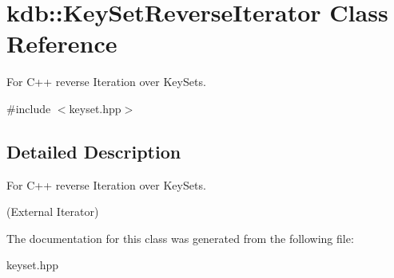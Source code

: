 \hypertarget{classkdb_1_1KeySetReverseIterator}{\section{kdb\+:\+:Key\+Set\+Reverse\+Iterator Class Reference}
\label{classkdb_1_1KeySetReverseIterator}
}


For C++ reverse Iteration over Key\+Sets.  




{\ttfamily \#include $<$keyset.\+hpp$>$}



\subsection{Detailed Description}
For C++ reverse Iteration over Key\+Sets. 

(External Iterator) 

The documentation for this class was generated from the following file\+:\begin{DoxyCompactItemize}
\item 
keyset.\+hpp\end{DoxyCompactItemize}
